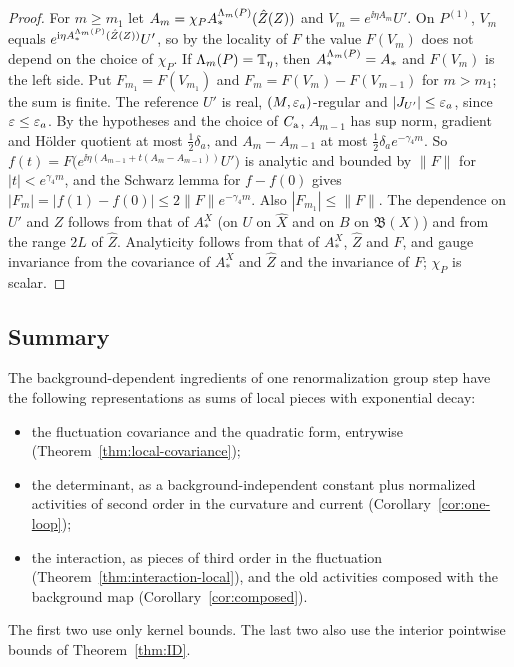 \begin{proof}
For $m\ge m_1$ let $A_m=\chi_PA^{\Lambda_m(P)}_*(\hat Z(Z))$ and $V_m=e^{\ii\eta A_m}U'$. On $P^{(1)}$, $V_m$ equals $e^{\mathrm i\eta A^{\Lambda_m(P)}_*(\hat Z(Z))}U'$, so by the locality of $F$ the value $F(V_m)$ does not depend on the choice of $\chi_P$. If $\Lambda_m(P)=\mathbb T_\eta$, then $A^{\Lambda_m(P)}_*=A_*$ and $F(V_m)$ is the left side. Put $F_{m_1}=F(V_{m_1})$ and $F_m=F(V_m)-F(V_{m-1})$ for $m>m_1$; the sum is finite. The reference $U'$ is real, $(M,\varepsilon_a)$-regular and $|J_{U'}|\le\varepsilon_a$, since $\varepsilon\le\varepsilon_a$. By the hypotheses and the choice of $C_{\rm a}$, $A_{m-1}$ has sup norm, gradient and H\"older quotient at most $\frac12\delta_a$, and $A_m-A_{m-1}$ at most $\frac12\delta_ae^{-\gamma_4m}$. So $f(t)=F\big(e^{\ii\eta(A_{m-1}+t(A_m-A_{m-1}))}U'\big)$ is analytic and bounded by $\|F\|$ for $|t|<e^{\gamma_4m}$, and the Schwarz lemma for $f-f(0)$ gives $|F_m|=|f(1)-f(0)|\le2\|F\|e^{-\gamma_4m}$. Also $|F_{m_1}|\le\|F\|$. The dependence on $U'$ and $Z$ follows from that of $A^X_*$ (on $U$ on $\hat X$ and on $B$ on $\mathfrak B(X)$) and from the range $2L$ of $\hat Z$. Analyticity follows from that of $A^X_*$, $\hat Z$ and $F$, and gauge invariance from the covariance of $A^X_*$ and $\hat Z$ and the invariance of $F$; $\chi_P$ is scalar.
\end{proof}

\subsection{Summary}\label{ss:39.4}

The background-dependent ingredients of one renormalization group step have the following representations as sums of local pieces with exponential decay:
\begin{itemize}
\item the fluctuation covariance and the quadratic form, entrywise (Theorem~\ref{thm:local-covariance});
\item the determinant, as a background-independent constant plus normalized activities of second order in the curvature and current (Corollary~\ref{cor:one-loop});
\item the interaction, as pieces of third order in the fluctuation (Theorem~\ref{thm:interaction-local}), and the old activities composed with the background map (Corollary~\ref{cor:composed}).
\end{itemize}
The first two use only kernel bounds. The last two also use the interior pointwise bounds of Theorem~\ref{thm:ID}.

